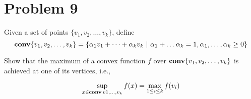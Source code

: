 \documentclass[11pt]{article}
\begin{document}
\clearpage
\section*{Problem 9}
Given a set of points $\{v_1, v_2, \dots, v_k\}$, define
\[
\mathop {\textbf{conv}}\{v_1, v_2, \dots, v_k\} = \{\alpha_1 v_1 + \dots + \alpha_k v_k~|~\alpha_1 + \dots \alpha_k = 1, \alpha_1, \dots, \alpha_k \geq 0\}
\]

Show that the maximum of a convex function $f$ over $\mathop {\textbf{conv}}\{v_1, v_2, \dots, v_k\}$ is achieved at one of its vertices, i.e.,

\[
\sup_{x\in\mathop {\textbf{conv}}{v1, \dots, v_k}} f(x) = \max_{1\leq i \leq k} f(v_i)
\]
\end{document}
